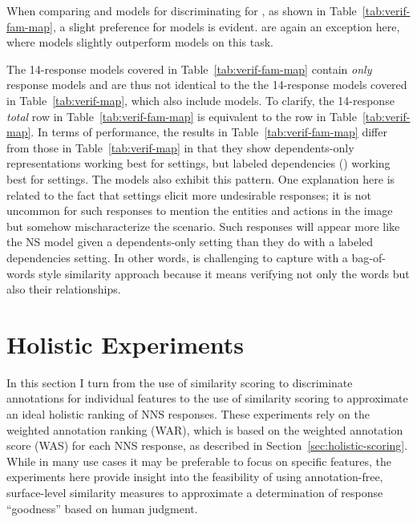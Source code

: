When comparing  and  models for discriminating for , as shown in Table~\ref{tab:verif-fam-map}, a slight preference for  models is evident.  are again an exception here, where  models slightly outperform  models on this task.

The  14-response models covered in Table~\ref{tab:verif-fam-map} contain \textit{only}  response models and are thus not identical to the the  14-response models covered in Table~\ref{tab:verif-map}, which also include  models. To clarify, the  14-response \textit{total} row in Table~\ref{tab:verif-fam-map} is equivalent to the  row in Table~\ref{tab:verif-map}. In terms of performance, the  results in Table~\ref{tab:verif-fam-map} differ from those in Table~\ref{tab:verif-map} in that they show dependents-only representations working best for  settings, but labeled dependencies () working best for  settings. The  models also exhibit this pattern. One explanation here is related to the fact that   settings elicit more undesirable responses; it is not uncommon for such responses to mention the entities and actions in the image but somehow mischaracterize the scenario. Such responses will appear more like the NS model given a dependents-only setting than they do with a labeled dependencies setting. In other words,  is challenging to capture with a bag-of-words style similarity approach because it means verifying not only the words but also their relationships.


\section{Holistic Experiments}
\label{sec:exp-holistic}
In this section I turn from the use of similarity scoring to discriminate annotations for individual features to the use of similarity scoring to approximate an ideal holistic ranking of NNS responses. These experiments rely on the weighted annotation ranking (WAR), which is based on the weighted annotation score (WAS) for each NNS response, as described in Section~\ref{sec:holistic-scoring}. While in many use cases it may be preferable to focus on specific features, the experiments here provide insight into the feasibility of using annotation-free, surface-level similarity measures to approximate a determination of response ``goodness'' based on human judgment.

